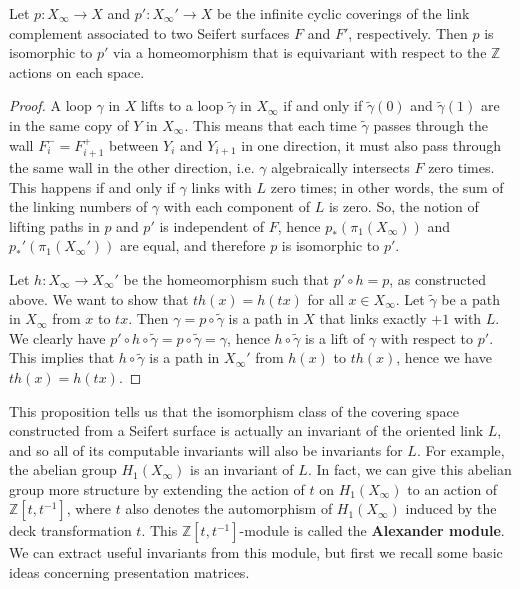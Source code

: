 \begin{prop}
Let $p : X_\infty \rightarrow X$ and $p' : X_\infty' \rightarrow X$ be the infinite cyclic coverings of the link complement associated to two Seifert surfaces $F$ and $F'$, respectively. Then $p$ is isomorphic to $p'$ via a homeomorphism that is equivariant with respect to the $\mathbb Z$ actions on each space.
\end{prop}
\begin{proof}
A loop $\gamma$ in $X$ lifts to a loop $\widetilde\gamma$ in $X_\infty$ if and only if $\widetilde\gamma(0)$ and $\widetilde\gamma(1)$ are in the same copy of $Y$ in $X_\infty$. This means that each time $\widetilde\gamma$ passes through the wall $F_i^-=F_{i+1}^+$ between $Y_i$ and $Y_{i+1}$ in one direction, it must also pass through the same wall in the other direction, i.e. $\gamma$ algebraically intersects $F$ zero times. This happens if and only if $\gamma$ links with $L$ zero times; in other words, the sum of the linking numbers of $\gamma$ with each component of $L$ is zero. So, the notion of lifting paths in $p$ and $p'$ is independent of $F$, hence $p_*(\pi_1(X_\infty))$ and $p_*'(\pi_1(X_\infty'))$ are equal, and therefore $p$ is isomorphic to $p'$.

Let $h : X_\infty \rightarrow X_\infty'$ be the homeomorphism such that $p' \circ h = p$, as constructed above. We want to show that $th(x)=h(tx)$ for all $x \in X_\infty$. Let $\widetilde\gamma$ be a path in $X_\infty$ from $x$ to $tx$. Then $\gamma=p\circ\widetilde\gamma$ is a path in $X$ that links exactly $+1$ with $L$. We clearly have $p' \circ h \circ \widetilde\gamma = p \circ \widetilde\gamma = \gamma$, hence $h \circ \widetilde\gamma$ is a lift of $\gamma$ with respect to $p'$. This implies that $h \circ \widetilde\gamma$ is a path in $X_\infty'$ from $h(x)$ to $th(x)$, hence we have $th(x)=h(tx)$.
\end{proof}

This proposition tells us that the isomorphism class of the covering space constructed from a Seifert surface is actually an invariant of the oriented link $L$, and so all of its computable invariants will also be invariants for $L$. For example, the abelian group $H_1(X_\infty)$ is an invariant of $L$. In fact, we can give this abelian group more structure by extending the action of $t$ on $H_1(X_\infty)$ to an action of  $\mathbb Z[t,t^{-1}]$, where $t$ also denotes the automorphism of $H_1(X_\infty)$ induced by the deck transformation $t$. This $\mathbb Z[t,t^{-1}]$-module is called the \textbf{Alexander module}. We can extract useful invariants from this module, but first we recall some basic ideas concerning presentation matrices.

